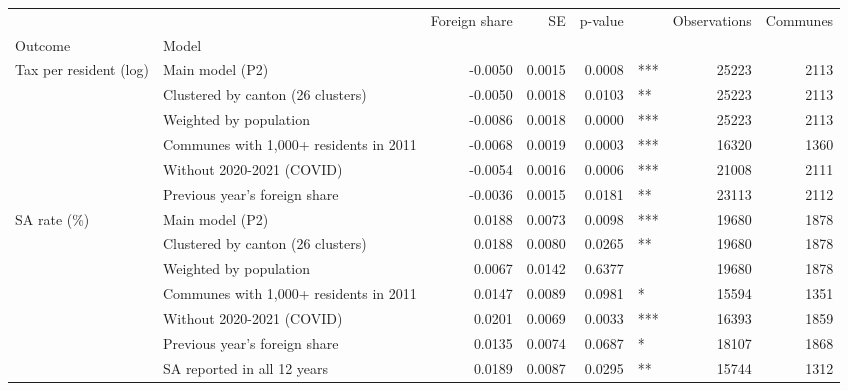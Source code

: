 \begin{tabular}{llrrrlrr}
\toprule
 &  & Foreign share & SE & p-value &  & Observations & Communes \\
Outcome & Model &  &  &  &  &  &  \\
\midrule
\multirow[t]{6}{*}{Tax per resident (log)} & Main model (P2) & -0.0050 & 0.0015 & 0.0008 & *** & 25223 & 2113 \\
 & Clustered by canton (26 clusters) & -0.0050 & 0.0018 & 0.0103 & ** & 25223 & 2113 \\
 & Weighted by population & -0.0086 & 0.0018 & 0.0000 & *** & 25223 & 2113 \\
 & Communes with 1,000+ residents in 2011 & -0.0068 & 0.0019 & 0.0003 & *** & 16320 & 1360 \\
 & Without 2020-2021 (COVID) & -0.0054 & 0.0016 & 0.0006 & *** & 21008 & 2111 \\
 & Previous year's foreign share & -0.0036 & 0.0015 & 0.0181 & ** & 23113 & 2112 \\
\cline{1-8}
\multirow[t]{7}{*}{SA rate (\%)} & Main model (P2) & 0.0188 & 0.0073 & 0.0098 & *** & 19680 & 1878 \\
 & Clustered by canton (26 clusters) & 0.0188 & 0.0080 & 0.0265 & ** & 19680 & 1878 \\
 & Weighted by population & 0.0067 & 0.0142 & 0.6377 &  & 19680 & 1878 \\
 & Communes with 1,000+ residents in 2011 & 0.0147 & 0.0089 & 0.0981 & * & 15594 & 1351 \\
 & Without 2020-2021 (COVID) & 0.0201 & 0.0069 & 0.0033 & *** & 16393 & 1859 \\
 & Previous year's foreign share & 0.0135 & 0.0074 & 0.0687 & * & 18107 & 1868 \\
 & SA reported in all 12 years & 0.0189 & 0.0087 & 0.0295 & ** & 15744 & 1312 \\
\cline{1-8}
\bottomrule
\end{tabular}
